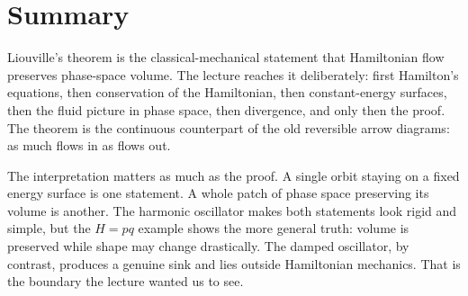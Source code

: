 \section{Summary}

Liouville's theorem is the classical-mechanical statement that Hamiltonian flow preserves phase-space volume. The lecture reaches it deliberately: first Hamilton's equations, then conservation of the Hamiltonian, then constant-energy surfaces, then the fluid picture in phase space, then divergence, and only then the proof. The theorem is the continuous counterpart of the old reversible arrow diagrams: as much flows in as flows out.

The interpretation matters as much as the proof. A single orbit staying on a fixed energy surface is one statement. A whole patch of phase space preserving its volume is another. The harmonic oscillator makes both statements look rigid and simple, but the \(H=pq\) example shows the more general truth: volume is preserved while shape may change drastically. The damped oscillator, by contrast, produces a genuine sink and lies outside Hamiltonian mechanics. That is the boundary the lecture wanted us to see.